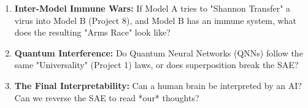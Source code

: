 \documentclass{article}
\begin{document}
\begin{enumerate}
    \item \textbf{Inter-Model Immune Wars:} If Model A tries to "Shannon Transfer" a virus into Model B (Project 8), and Model B has an immune system, what does the resulting "Arms Race" look like?
    \item \textbf{Quantum Interference:} Do Quantum Neural Networks (QNNs) follow the same "Universality" (Project 1) laws, or does superposition break the SAE?
    \item \textbf{The Final Interpretability:} Can a human brain be interpreted by an AI? Can we reverse the SAE to read *our* thoughts?
\end{enumerate}
\end{document}
